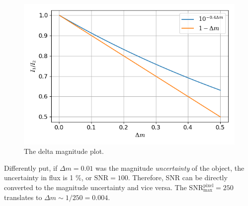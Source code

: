\begin{figure} [ht!]
  \centering
  \includegraphics[width=0.5\linewidth]{figs/delta_mag}
  \caption{The delta magnitude plot.}
  \label{fig:deltamag}
\end{figure}

Differently put, if $ \Delta m =0.01 $ was the magnitude \textit{uncertainty} of the object, the uncertainty in flux is 1 \%, or $ \mathrm{SNR} = 100 $. Therefore, SNR can be directly converted to the magnitude uncertainty and vice versa. The $ \mathrm{SNR}_\mathrm{max}^\mathrm{pixel} = 250 $ translates to $ \Delta m \sim 1/250 = 0.004 $.


















